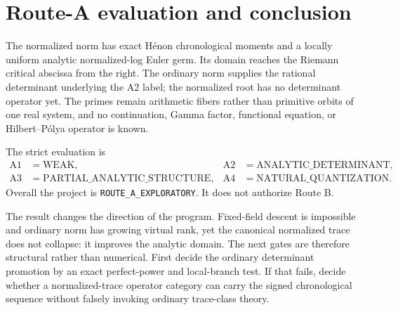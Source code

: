 \section{Route-A evaluation and conclusion}

The normalized norm has exact H\'enon chronological moments and a locally
uniform analytic normalized-log Euler germ.  Its domain reaches the Riemann
critical abscissa from the right.  The ordinary norm supplies the rational
determinant underlying the A2 label; the normalized root has no determinant
operator yet.  The primes remain arithmetic fibers rather than primitive
orbits of one real system, and no continuation, Gamma factor, functional
equation, or Hilbert--P\'olya operator is known.

The strict evaluation is
\begin{align*}
 \mathrm{A1}&=\mathrm{WEAK},
 &\mathrm{A2}&=\mathrm{ANALYTIC\_DETERMINANT},\\
 \mathrm{A3}&=\mathrm{PARTIAL\_ANALYTIC\_STRUCTURE},
 &\mathrm{A4}&=\mathrm{NATURAL\_QUANTIZATION}.
\end{align*}
Overall the project is \texttt{ROUTE\_A\_EXPLORATORY}.  It does not authorize
Route B.

The result changes the direction of the program.  Fixed-field descent is
impossible and ordinary norm has growing virtual rank, yet the canonical
normalized trace does not collapse: it improves the analytic domain.  The
next gates are therefore structural rather than numerical.  First decide the
ordinary determinant promotion by an exact perfect-power and local-branch
test.  If that fails, decide whether a normalized-trace operator category can
carry the signed chronological sequence without falsely invoking ordinary
trace-class theory.
